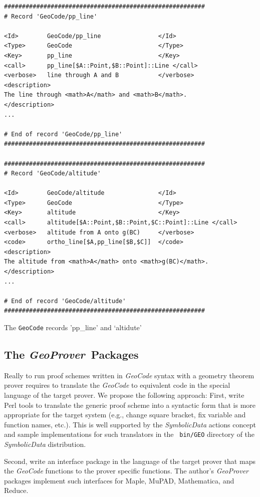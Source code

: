 \documentclass[11pt]{article}
\newcommand{\GC}{\textit{Geo\-Code}}
\newcommand{\GP}{\textit{Geo\-Prover}}
\newcommand{\SD}{\textit{Symbolic\-Data}}
\begin{document}
\begin{table}[p]\label{table:2}{
\begin{verbatim}
########################################################
# Record 'GeoCode/pp_line' 

<Id>        GeoCode/pp_line                </Id>
<Type>      GeoCode                        </Type>
<Key>       pp_line                        </Key>
<call>      pp_line[$A::Point,$B::Point]::Line </call>
<verbose>   line through A and B           </verbose>
<description> 
The line through <math>A</math> and <math>B</math>. 
</description>
... 

# End of record 'GeoCode/pp_line'
########################################################

########################################################
# Record 'GeoCode/altitude'

<Id>        GeoCode/altitude               </Id>
<Type>      GeoCode                        </Type>
<Key>       altitude                       </Key>
<call>      altitude[$A::Point,$B::Point,$C::Point]::Line </call>
<verbose>   altitude from A onto g(BC)     </verbose>
<code>      ortho_line[$A,pp_line[$B,$C]]  </code>
<description> 
The altitude from <math>A</math> onto <math>g(BC)</math>. 
</description>
...

# End of record 'GeoCode/altitude'
########################################################

\end{verbatim}}
\centerline{The {\tt GeoCode} records 'pp\_line' and `altidute'}
\end{table}

\subsection{The \GP\ Packages}

Really to run proof schemes written in {\GC} syntax with a geometry theorem
prover requires to translate the {\GC} to equivalent code in the special
language of the target prover. We propose the following approach: First, write
Perl tools to translate the generic proof scheme into a syntactic form that is
more appropriate for the target system (e.g., change square bracket, fix
variable and function names, etc.). This is well supported by the {\SD}
actions concept and sample implementations for such translators in the {\tt
  bin/GEO} directory of the {\SD} distribution.

Second, write an interface package in the language of the target prover that
maps the {\GC} functions to the prover specific functions.  The author's {\GP}
packages implement such interfaces for Maple, MuPAD, Mathematica, and Reduce.
\end{document}
